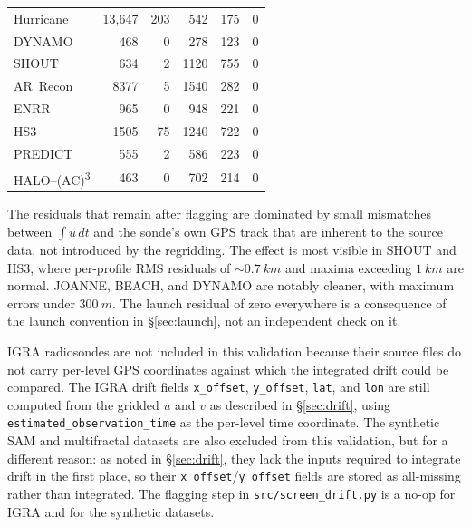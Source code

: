 \documentclass[11pt]{article}
\begin{document}
\begin{table}[h]
\begin{tabular}{lrrrrr}
Hurricane         & 13{,}647  & 203            & 542             & 175             & 0 \\
DYNAMO            & 468       & 0              & 278             & 123             & 0 \\
SHOUT             & 634       & 2              & 1120            & 755             & 0 \\
AR~Recon          & 8377      & 5              & 1540            & 282             & 0 \\
ENRR              & 965       & 0              & 948             & 221             & 0 \\
HS3               & 1505      & 75             & 1240            & 722             & 0 \\
PREDICT           & 555       & 2              & 586             & 223             & 0 \\
HALO--(AC)\textsuperscript{3} & 463 & 0          & 702             & 214             & 0 \\
\bottomrule
\end{tabular}
\end{table}

The residuals that remain after flagging are dominated by small mismatches between $\int u\,dt$ and the sonde's own GPS track that are inherent to the source data, not introduced by the regridding.  The effect is most visible in SHOUT and HS3, where per-profile RMS residuals of $\sim\SI{0.7}{km}$ and maxima exceeding $\SI{1}{km}$ are normal.  JOANNE, BEACH, and DYNAMO are notably cleaner, with maximum errors under $\SI{300}{m}$.  The launch residual of zero everywhere is a consequence of the launch convention in \S\ref{sec:launch}, not an independent check on it.

IGRA radiosondes are not included in this validation because their source files do not carry per-level GPS coordinates against which the integrated drift could be compared.  The IGRA drift fields \texttt{x\_offset}, \texttt{y\_offset}, \texttt{lat}, and \texttt{lon} are still computed from the gridded $u$ and $v$ as described in \S\ref{sec:drift}, using \texttt{estimated\_observation\_time} as the per-level time coordinate.  The synthetic SAM and multifractal datasets are also excluded from this validation, but for a different reason: as noted in \S\ref{sec:drift}, they lack the inputs required to integrate drift in the first place, so their \texttt{x\_offset}/\texttt{y\_offset} fields are stored as all-missing rather than integrated.  The flagging step in \texttt{src/screen\_drift.py} is a no-op for IGRA and for the synthetic datasets.



\end{document}
